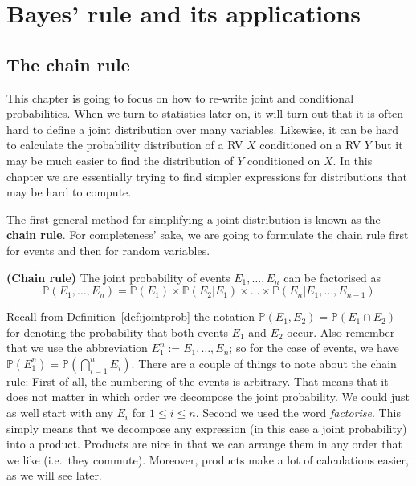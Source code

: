 
\setcounter{chapter}{3}
\chapter{Bayes' rule and its applications}

\section{The chain rule}

This chapter is going to focus on how to re-write joint and conditional probabilities. When we turn to statistics later on, it will
turn out that it is often hard to define a joint distribution over many variables. Likewise, it can be hard to calculate 
the probability distribution of a RV $ X $ conditioned on a RV $ Y $ but it may be much easier to find the distribution of $ Y $
conditioned on $ X $. In this chapter we are essentially trying to find simpler expressions for distributions that may be hard to
compute.

The first general method for simplifying a joint distribution is known as the \textbf{chain rule}. For completeness' sake, we are going to formulate the chain rule first for events and then for random variables.

\begin{Theorem}{\textbf{(Chain rule)}} \label{thm:chain}
The joint probability of events $ E_{1}, \ldots, E_{n} $ can be factorised as
$$ \mathbb{P}(E_{1}, \ldots, E_{n}) = \mathbb{P}(E_{1}) \times \mathbb{P}(E_{2}|E_{1}) \times \ldots \times \mathbb{P}(E_{n}|E_{1}, \ldots, E_{n-1}) $$
\end{Theorem} 
Recall from Definition~\ref{def:jointprob} the notation
$\mathbb{P}(E_1,E_2) = \mathbb{P}(E_1 \cap E_2)$ for denoting the
probability that both events $E_1$ and $E_2$ occur. Also remember that
we use the abbreviation $E_1^n := E_1, \ldots, E_n$; so for the case
of events, we have $\mathbb{P}(E_1^n) = \mathbb{P}(\bigcap_{i=1}^n E_i)$. There are a couple of things to note about the chain rule: First of all, the numbering of the events is arbitrary. That means that it does not matter in which
order we decompose the joint probability. We could just as well start with any $ E_{i} $ for $ 1 \leq i \leq n $. Second we used the 
word \textit{factorise}. This simply means that we decompose any expression (in this case a joint probability) into a product. Products are
nice in that we can arrange them in any order that we like (i.e.\ they commute). Moreover, products make a lot of calculations easier, as we will
see later.


